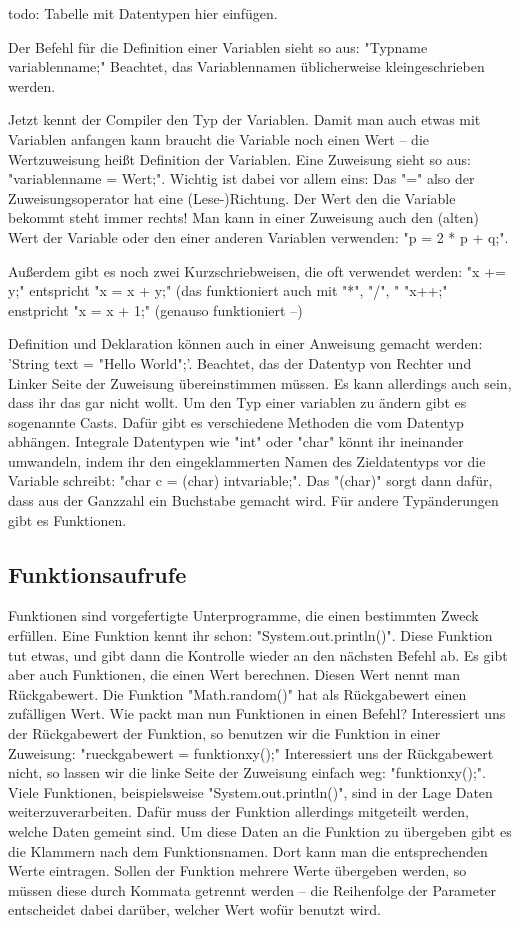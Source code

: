 todo: Tabelle mit Datentypen hier einfügen.

Der Befehl für die Definition einer Variablen sieht so aus: "Typname variablenname;"
Beachtet, das Variablennamen üblicherweise kleingeschrieben werden.

Jetzt kennt der Compiler den Typ der Variablen. 
Damit man auch etwas mit Variablen anfangen kann braucht die Variable noch einen Wert – die Wertzuweisung heißt Definition der Variablen.
Eine Zuweisung sieht so aus: "variablenname = Wert;".
Wichtig ist dabei vor allem eins: Das "=" also der Zuweisungsoperator hat eine (Lese-)Richtung. Der Wert den die Variable bekommt steht immer rechts!
Man kann in einer Zuweisung auch den (alten) Wert der Variable oder den einer anderen Variablen verwenden: "p = 2 * p + q;".

Außerdem gibt es noch zwei Kurzschriebweisen, die oft verwendet werden:
"x += y;" entspricht "x = x + y;" (das funktioniert auch mit "*", "/", "%
"x++;" enstpricht "x = x + 1;" (genauso funktioniert --)

Definition und Deklaration können auch in einer Anweisung gemacht werden: 'String text = "Hello World";'.
Beachtet, das der Datentyp von Rechter und Linker Seite der Zuweisung übereinstimmen müssen. Es kann allerdings auch sein, dass ihr das gar nicht wollt.
Um den Typ einer variablen zu ändern gibt es sogenannte Casts. Dafür gibt es verschiedene Methoden die vom Datentyp abhängen. Integrale Datentypen wie "int" oder "char" könnt ihr ineinander umwandeln, indem ihr den eingeklammerten Namen des Zieldatentyps vor die Variable schreibt: "char c = (char) intvariable;". Das "(char)" sorgt dann dafür, dass aus der Ganzzahl ein Buchstabe gemacht wird.
Für andere Typänderungen gibt es Funktionen.

\subsection {Funktionsaufrufe}
Funktionen sind vorgefertigte Unterprogramme, die einen bestimmten Zweck erfüllen. Eine Funktion kennt ihr schon: "System.out.println()".
Diese Funktion tut etwas, und gibt dann die Kontrolle wieder an den nächsten Befehl ab. Es gibt aber auch Funktionen, die einen Wert berechnen.
Diesen Wert nennt man Rückgabewert. Die Funktion "Math.random()" hat als Rückgabewert einen zufälligen Wert.
Wie packt man nun Funktionen in einen Befehl? Interessiert uns der Rückgabewert der Funktion, so benutzen wir die Funktion in einer Zuweisung: "rueckgabewert = funktionxy();"
Interessiert uns der Rückgabewert nicht, so lassen wir die linke Seite der Zuweisung einfach weg: "funktionxy();".
Viele Funktionen, beispielsweise "System.out.println()", sind in der Lage Daten weiterzuverarbeiten. Dafür muss der Funktion allerdings mitgeteilt werden, welche Daten gemeint sind.
Um diese Daten an die Funktion zu übergeben gibt es die Klammern nach dem Funktionsnamen. Dort kann man die entsprechenden Werte eintragen.
Sollen der Funktion mehrere Werte übergeben werden, so müssen diese durch Kommata getrennt werden – die Reihenfolge der Parameter entscheidet dabei darüber, welcher Wert wofür benutzt wird.

